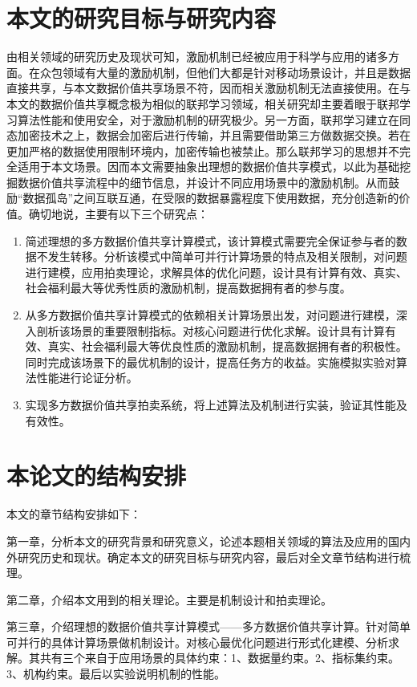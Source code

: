 \documentclass[promaster]{thesis-uestc}
\begin{document}
\section{本文的研究目标与研究内容}
由相关领域的研究历史及现状可知，激励机制已经被应用于科学与应用的诸多方面。在众包领域有大量的激励机制，但他们大都是针对移动场景设计，并且是数据直接共享，与本文数据价值共享场景不符，因而相关激励机制无法直接使用。在与本文的数据价值共享概念极为相似的联邦学习领域，相关研究却主要着眼于联邦学习算法性能和使用安全，对于激励机制的研究极少。另一方面，联邦学习建立在同态加密技术之上，数据会加密后进行传输，并且需要借助第三方做数据交换。若在更加严格的数据使用限制环境内，加密传输也被禁止。那么联邦学习的思想并不完全适用于本文场景。因而本文需要抽象出理想的数据价值共享模式，以此为基础挖掘数据价值共享流程中的细节信息，并设计不同应用场景中的激励机制。从而鼓励“数据孤岛”之间互联互通，在受限的数据暴露程度下使用数据，充分创造新的价值。确切地说，主要有以下三个研究点：

\begin{enumerate}
    \item 简述理想的多方数据价值共享计算模式，该计算模式需要完全保证参与者的数据不发生转移。分析该模式中简单可并行计算场景的特点及相关限制，对问题进行建模，应用拍卖理论，求解具体的优化问题，设计具有计算有效、真实、社会福利最大等优秀性质的激励机制，提高数据拥有者的参与度。
    \item 从多方数据价值共享计算模式的依赖相关计算场景出发，对问题进行建模，深入剖析该场景的重要限制指标。对核心问题进行优化求解。设计具有计算有效、真实、社会福利最大等优良性质的激励机制，提高数据拥有者的积极性。同时完成该场景下的最优机制的设计，提高任务方的收益。实施模拟实验对算法性能进行论证分析。
    \item 实现多方数据价值共享拍卖系统，将上述算法及机制进行实装，验证其性能及有效性。
\end{enumerate}


\section{本论文的结构安排}

本文的章节结构安排如下：

第一章，分析本文的研究背景和研究意义，论述本题相关领域的算法及应用的国内外研究历史和现状。确定本文的研究目标与研究内容，最后对全文章节结构进行梳理。

第二章，介绍本文用到的相关理论。主要是机制设计和拍卖理论。

第三章，介绍理想的数据价值共享计算模式——多方数据价值共享计算。针对简单可并行的具体计算场景做机制设计。对核心最优化问题进行形式化建模、分析求解。其共有三个来自于应用场景的具体约束：1、数据量约束。2、指标集约束。3、机构约束。最后以实验说明机制的性能。
\end{document}
